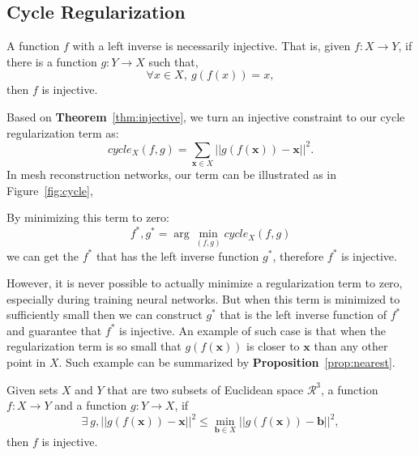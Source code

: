 \subsection{Cycle Regularization}
\label{subsec:cyclereg}
\begin{m_thm}
\label{thm:injective}
A function $f$ with a left inverse is necessarily injective. That is, given $f:X \rightarrow Y$, if there is a function $g:Y \rightarrow X$ such that,
\begin{equation}
\label{equ:injective}
\forall x \in X,~g(f(x)) = x,
\end{equation}
then $f$ is injective.
\end{m_thm}

Based on \textbf{Theorem}~\ref{thm:injective}, we turn an injective constraint to our cycle regularization term as:
\begin{equation}
\label{equ:cycle_term}
cycle_X(f,g)=\sum_{\mathbf{x}\in X}||g(f(\mathbf{x})) - \mathbf{x}||^2.
\end{equation}
In mesh reconstruction networks, our term can be illustrated as in Figure~\ref{fig:cycle},

By minimizing this term to zero:
\begin{equation}
f^*,g^* = \arg\min_{(f,g)} cycle_X(f,g)
\end{equation}
we can get the $f^*$ that has the left inverse function $g^*$, therefore $f^*$ is injective. 

However, it is never possible to actually minimize a regularization term to zero, especially during training neural networks. But when this term is minimized to sufficiently small then we can construct $g^*$ that is the left inverse function of $f^*$ and guarantee that $f^*$ is injective. An example of such case is that when the regularization term is so small that $g(f(\mathbf{x}))$ is closer to $\mathbf{x}$ than any other point in $X$. Such example can be summarized by \textbf{Proposition}~\ref{prop:nearest}.

\begin{m_prop}
	\label{prop:nearest}
	Given sets $X$ and $Y$ that are two subsets of Euclidean space $\mathcal{R}^3$, a function $f:X \rightarrow Y$  and a function $g:Y \rightarrow X$, if
	\begin{equation}
	\exists~g, || g(f(\mathbf{x})) - \mathbf{x} ||^2 \leq \min_{\mathbf{b} \in X}|| g(f(\mathbf{x})) - \mathbf{b} ||^2,
	\end{equation}
	then $f$ is injective.
\end{m_prop}

